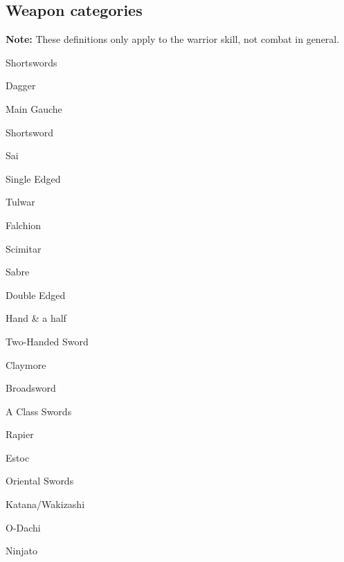  \begin{table*}[h]
\begin{minipage}{\linewidth}
\begin{multicols}{4}
\subsection{Weapon categories}

\textbf{Note:} These definitions only apply to the warrior skill, not
combat in general.

\begin{Enumerate}
\item Shortswords
\begin{Itemize}
\item Dagger
\item Main Gauche
\item Shortsword
\item Sai
\end{Itemize}

\item Single Edged
\begin{Itemize}
\item Tulwar
\item Falchion
\item Scimitar
\item Sabre
\end{Itemize}

\item Double Edged
\begin{Itemize}
\item Hand \& a half
\item Two-Handed Sword
\item Claymore
\item Broadsword
\end{Itemize}

\item A Class Swords
\begin{Itemize}
\item Rapier
\item Estoc
\end{Itemize}
                   
\item Oriental Swords          
\begin{Itemize}
\item Katana/Wakizashi
\item O-Dachi
\item Ninjato
\end{Itemize}


\end{Enumerate}
\end{multicols}
\end{minipage}
\end{table*}
